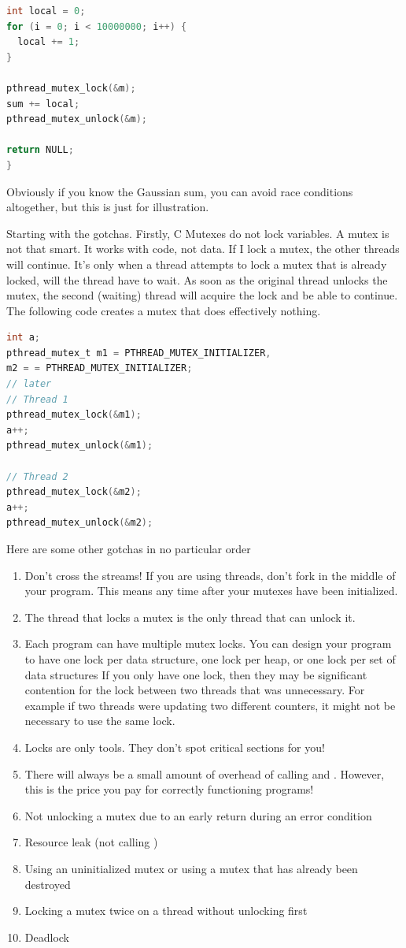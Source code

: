 \begin{lstlisting}[language=C]
int local = 0;
for (i = 0; i < 10000000; i++) {
  local += 1;
}

pthread_mutex_lock(&m);
sum += local;
pthread_mutex_unlock(&m);

return NULL;
}
\end{lstlisting}

Obviously if you know the Gaussian sum, you can avoid race conditions altogether, but this is just for illustration.

Starting with the gotchas.
Firstly, C Mutexes do not lock variables.
A mutex is not that smart.
It works with code, not data.
If I lock a mutex, the other threads will continue.
It's only when a thread attempts to lock a mutex that is already locked, will the thread have to wait.
As soon as the original thread unlocks the mutex, the second (waiting) thread will acquire the lock and be able to continue.
The following code creates a mutex that does effectively nothing.

\begin{lstlisting}[language=C]
int a;
pthread_mutex_t m1 = PTHREAD_MUTEX_INITIALIZER,
m2 = = PTHREAD_MUTEX_INITIALIZER;
// later
// Thread 1
pthread_mutex_lock(&m1);
a++;
pthread_mutex_unlock(&m1);

// Thread 2
pthread_mutex_lock(&m2);
a++;
pthread_mutex_unlock(&m2);
\end{lstlisting}

Here are some other gotchas in no particular order
\begin{enumerate}
\item Don't cross the streams!
If you are using threads, don't fork in the middle of your program.
This means any time after your mutexes have been initialized.
\item The thread that locks a mutex is the only thread that can unlock it.
\item Each program can have multiple mutex locks.
  You can design your program to have one lock per data structure,
  one lock per heap,
  or one lock per set of data structures
  If you only have one lock, then they may be significant contention for the lock between two threads that was unnecessary.
  For example if two threads were updating two different counters, it might not be necessary to use the same lock.
\item Locks are only tools.
  They don't spot critical sections for you!
\item There will always be a small amount of overhead of calling  and .
However, this is the price you pay for correctly functioning programs!
\item
  Not unlocking a mutex due to an early return during an error condition
\item
  Resource leak (not calling )
\item
  Using an uninitialized mutex or using a mutex that has already been destroyed
\item
  Locking a mutex twice on a thread without unlocking first
\item
  Deadlock
\end{enumerate}

